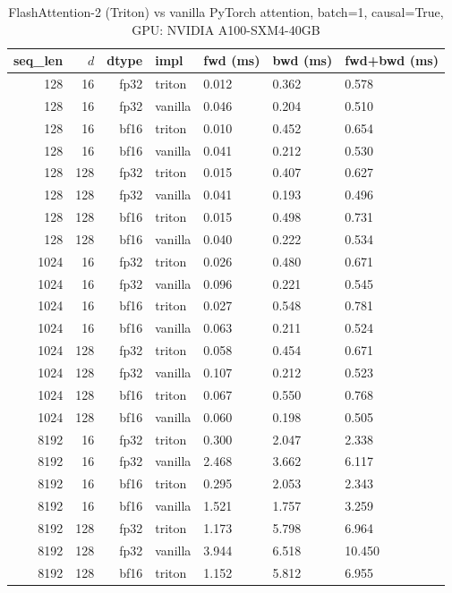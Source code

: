 \begin{table}[h]
\centering
\small
\caption{FlashAttention-2 (Triton) vs vanilla PyTorch attention, batch=1, causal=True, GPU: NVIDIA A100-SXM4-40GB}
\label{tab:flash_bench}
\begin{tabular}{rrrllll}
\toprule
seq\_len & $d$ & dtype & impl & fwd (ms) & bwd (ms) & fwd+bwd (ms) \\
\midrule
128 & 16 & fp32 & triton & 0.012 & 0.362 & 0.578 \\
128 & 16 & fp32 & vanilla & 0.046 & 0.204 & 0.510 \\
[3pt]
128 & 16 & bf16 & triton & 0.010 & 0.452 & 0.654 \\
128 & 16 & bf16 & vanilla & 0.041 & 0.212 & 0.530 \\
[3pt]
128 & 128 & fp32 & triton & 0.015 & 0.407 & 0.627 \\
128 & 128 & fp32 & vanilla & 0.041 & 0.193 & 0.496 \\
[3pt]
128 & 128 & bf16 & triton & 0.015 & 0.498 & 0.731 \\
128 & 128 & bf16 & vanilla & 0.040 & 0.222 & 0.534 \\
[3pt]
1024 & 16 & fp32 & triton & 0.026 & 0.480 & 0.671 \\
1024 & 16 & fp32 & vanilla & 0.096 & 0.221 & 0.545 \\
[3pt]
1024 & 16 & bf16 & triton & 0.027 & 0.548 & 0.781 \\
1024 & 16 & bf16 & vanilla & 0.063 & 0.211 & 0.524 \\
[3pt]
1024 & 128 & fp32 & triton & 0.058 & 0.454 & 0.671 \\
1024 & 128 & fp32 & vanilla & 0.107 & 0.212 & 0.523 \\
[3pt]
1024 & 128 & bf16 & triton & 0.067 & 0.550 & 0.768 \\
1024 & 128 & bf16 & vanilla & 0.060 & 0.198 & 0.505 \\
[3pt]
8192 & 16 & fp32 & triton & 0.300 & 2.047 & 2.338 \\
8192 & 16 & fp32 & vanilla & 2.468 & 3.662 & 6.117 \\
[3pt]
8192 & 16 & bf16 & triton & 0.295 & 2.053 & 2.343 \\
8192 & 16 & bf16 & vanilla & 1.521 & 1.757 & 3.259 \\
[3pt]
8192 & 128 & fp32 & triton & 1.173 & 5.798 & 6.964 \\
8192 & 128 & fp32 & vanilla & 3.944 & 6.518 & 10.450 \\
[3pt]
8192 & 128 & bf16 & triton & 1.152 & 5.812 & 6.955 \\

\end{tabular}
\end{table}
